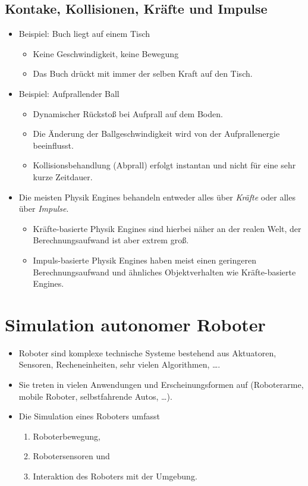     \section{Kontake, Kollisionen, Kräfte und Impulse} %
        \begin{itemize}
        	\item Beispiel: Buch liegt auf einem Tisch
	        	\begin{itemize}
	        		\item Keine Geschwindigkeit, keine Bewegung
	        		\item Das Buch drückt mit immer der selben Kraft auf den Tisch.
	        	\end{itemize}
	        \item Beispiel: Aufprallender Ball
		        \begin{itemize}
		        	\item Dynamischer Rückstoß bei Aufprall auf dem Boden.
		        	\item Die Änderung der Ballgeschwindigkeit wird von der Aufprallenergie beeinflusst.
		        	\item Kollisionsbehandlung (Abprall) erfolgt instantan und nicht für eine sehr kurze Zeitdauer.
		        \end{itemize}
		    \item Die meisten Physik Engines behandeln entweder alles über \textit{Kräfte} oder alles über \textit{Impulse}.
			    \begin{itemize}
			    	\item Kräfte-basierte Physik Engines sind hierbei näher an der realen Welt, der Berechnungsaufwand ist aber extrem groß.
			    	\item Impuls-basierte Physik Engines haben meist einen geringeren Berechnungsaufwand und ähnliches Objektverhalten wie Kräfte-basierte Engines.
			    \end{itemize}
        \end{itemize}

\chapter{Simulation autonomer Roboter} %
    \begin{itemize}
    	\item Roboter sind komplexe technische Systeme bestehend aus Aktuatoren, Sensoren, Recheneinheiten, sehr vielen Algorithmen, \dots.
    	\item Sie treten in vielen Anwendungen und Erscheinungsformen auf (Roboterarme, mobile Roboter, selbstfahrende Autos, \dots).
    	\item Die Simulation eines Roboters umfasst
        	\begin{enumerate}
        		\item Roboterbewegung,
        		\item Robotersensoren und
        		\item Interaktion des Roboters mit der Umgebung.
        	\end{enumerate}
    \end{itemize}

